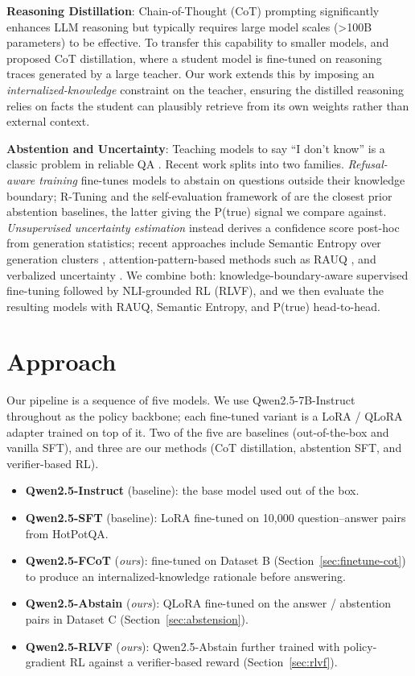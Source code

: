 \documentclass[11pt]{article}
\begin{document}
\textbf{Reasoning Distillation}: Chain-of-Thought (CoT) prompting significantly enhances LLM reasoning but typically requires large model scales (>100B parameters) to be effective. To transfer this capability to smaller models, \citet{li2023cotdistill} and \citet{ho2023largelanguagemodelsreasoning} proposed CoT distillation, where a student model is fine-tuned on reasoning traces generated by a large teacher. Our work extends this by imposing an \emph{internalized-knowledge} constraint on the teacher, ensuring the distilled reasoning relies on facts the student can plausibly retrieve from its own weights rather than external context.

\textbf{Abstention and Uncertainty}: Teaching models to say ``I don't know'' is a classic problem in reliable QA \citep{rajpurkar2018know}. Recent work splits into two families. \emph{Refusal-aware training} fine-tunes models to abstain on questions outside their knowledge boundary; R-Tuning \citep{zhang2024rtuning} and the self-evaluation framework of \citet{kadavath2022language} are the closest prior abstention baselines, the latter giving the P(true) signal we compare against. \emph{Unsupervised uncertainty estimation} instead derives a confidence score post-hoc from generation statistics; recent approaches include Semantic Entropy over generation clusters \citep{Farquhar2024Detecting}, attention-pattern-based methods such as RAUQ \citep{vazhentsev2025rauq}, and verbalized uncertainty \citep{lin2022teaching}. We combine both: knowledge-boundary-aware supervised fine-tuning followed by NLI-grounded RL (RLVF), and we then evaluate the resulting models with RAUQ, Semantic Entropy, and P(true) head-to-head.

\section{Approach}

Our pipeline is a sequence of five models. We use Qwen2.5-7B-Instruct \citep{qwen2025qwen25technicalreport} throughout as the policy backbone; each fine-tuned variant is a LoRA / QLoRA adapter trained on top of it. Two of the five are baselines (out-of-the-box and vanilla SFT), and three are our methods (CoT distillation, abstention SFT, and verifier-based RL).

\begin{itemize}
\item \textbf{Qwen2.5-Instruct} (baseline): the base model used out of the box.
\item \textbf{Qwen2.5-SFT} (baseline): LoRA fine-tuned on 10{,}000 question--answer pairs from HotPotQA.
\item \textbf{Qwen2.5-FCoT} (\emph{ours}): fine-tuned on Dataset B (Section~\ref{sec:finetune-cot}) to produce an internalized-knowledge rationale before answering.
\item \textbf{Qwen2.5-Abstain} (\emph{ours}): QLoRA fine-tuned on the answer / abstention pairs in Dataset C (Section~\ref{sec:abstension}).
\item \textbf{Qwen2.5-RLVF} (\emph{ours}): Qwen2.5-Abstain further trained with policy-gradient RL against a verifier-based reward (Section~\ref{sec:rlvf}).
\end{itemize}
\end{document}
